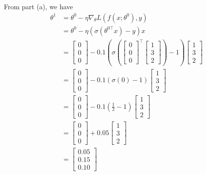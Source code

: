 \documentclass[a4paper]{article}
\theoremstyle{definition}
\newenvironment{soln}{
    \leavevmode\color{blue}\ignorespaces
}{}
\begin{document}
\begin{enumerate}
\begin{enumerate}
	\begin{soln}  From part (a), we have
		$$\begin{aligned} 
			\theta^1 &= \theta^0 - \eta\nabla_{\theta}L(f(x;\theta^0), y) \\[1ex]
			&= \theta^0 - \eta \left(\sigma(\theta^{0 \top} x) - y \right)x \\[1ex]
			&= \begin{bmatrix} 0 \\ 0 \\ 0 \end{bmatrix} - 0.1 \left(\sigma \left(\begin{bmatrix} 0 \\ 0 \\ 0 \end{bmatrix}^\top \begin{bmatrix} 1 \\ 3 \\ 2 \end{bmatrix}\right) - 1\right)\begin{bmatrix} 1 \\ 3 \\ 2 \end{bmatrix} \\[1ex]
			&= \begin{bmatrix} 0 \\ 0 \\ 0 \end{bmatrix} - 0.1 \left(\sigma(0) - 1\right)\begin{bmatrix} 1 \\ 3 \\ 2 \end{bmatrix} \\[1ex]
			&= \begin{bmatrix} 0 \\ 0 \\ 0 \end{bmatrix} - 0.1 \left(\frac{1}{2} - 1\right)\begin{bmatrix} 1 \\ 3 \\ 2 \end{bmatrix} \\[1ex]
			&= \begin{bmatrix} 0 \\ 0 \\ 0 \end{bmatrix} + 0.05 \begin{bmatrix} 1 \\ 3 \\ 2 \end{bmatrix} \\[1ex]
			&= \begin{bmatrix} 0.05 \\ 0.15 \\ 0.10 \end{bmatrix}
		\end{aligned}$$
	\end{soln}
\end{enumerate}
\end{enumerate}
\end{document}
